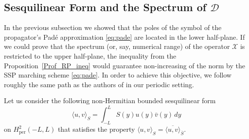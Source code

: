 \documentclass[11pt,a4paper]{article}
\newcommand{\cD}{\mathcal{D}}
\newcommand{\cX}{\mathcal{X}}
\theoremstyle{plain}%
\theoremstyle{definition}
\theoremstyle{remark}
\begin{document}
\subsection{Sesquilinear Form and the Spectrum of $\cD$}
In the previous subsection we showed that the poles of the symbol of the propagator's Pad\'e approximation \eqref{eq:pade} are located in the lower half-plane. 
If we could prove that the spectrum (or, say, numerical range) of the operator $\cX$ is restricted to the upper half-plane, the inequality from the Proposition~\ref{Prof_RP_ineq} would guarantee non-increasing of the norm by the SSP marching scheme \eqref{eq:pade}. 
In order to achieve this objective, we follow roughly the same path as the authors of \cite{kim2010} in our periodic setting.

Let us consider the following non-Hermitian bounded sesquilinear form
\begin{equation}\label{sesquiform}
    \langle u,v\rangle_S = \int_{-L}^L S(y) u(y) \bar{v}(y) \,dy
\end{equation}
on $H^2_{\mathrm{per}}(-L,L)$ that satisfies the property $\langle u,v\rangle_S = \overline{\langle u,v\rangle}_{\bar{S}}$.
\end{document}
